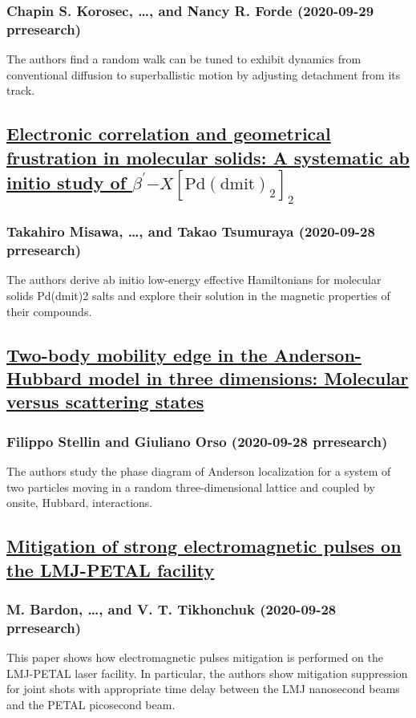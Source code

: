 \subsubsection*{Chapin S. Korosec, \dots, and Nancy R. Forde (2020-09-29 prresearch)}
The authors find a random walk can be tuned to exhibit dynamics from conventional diffusion to superballistic motion by adjusting detachment from its track.
\subsection*{\href{http://link.aps.org/doi/10.1103/PhysRevResearch.2.032072}{Electronic correlation and geometrical frustration in molecular solids: A systematic ab initio study of ${β}^{′}\text{−}X{[\mathrm{Pd}{(\mathrm{dmit})}_{2}]}_{2}$}}
\subsubsection*{Takahiro Misawa, \dots, and Takao Tsumuraya (2020-09-28 prresearch)}
The authors derive ab initio low-energy effective Hamiltonians for molecular solids Pd(dmit)2 salts and explore their solution in the magnetic properties of their compounds.
\subsection*{\href{http://link.aps.org/doi/10.1103/PhysRevResearch.2.033501}{Two-body mobility edge in the Anderson-Hubbard model in three dimensions: Molecular versus scattering states}}
\subsubsection*{Filippo Stellin and Giuliano Orso (2020-09-28 prresearch)}
The authors study the phase diagram of Anderson localization for a system of two particles moving in a random three-dimensional lattice and coupled by onsite, Hubbard, interactions.
\subsection*{\href{http://link.aps.org/doi/10.1103/PhysRevResearch.2.033502}{Mitigation of strong electromagnetic pulses on the LMJ-PETAL facility}}
\subsubsection*{M. Bardon, \dots, and V. T. Tikhonchuk (2020-09-28 prresearch)}
This paper shows how electromagnetic pulses mitigation is performed on the LMJ-PETAL laser facility. In particular, the authors show mitigation suppression for joint shots with appropriate time delay between the LMJ nanosecond beams and the PETAL picosecond beam.
